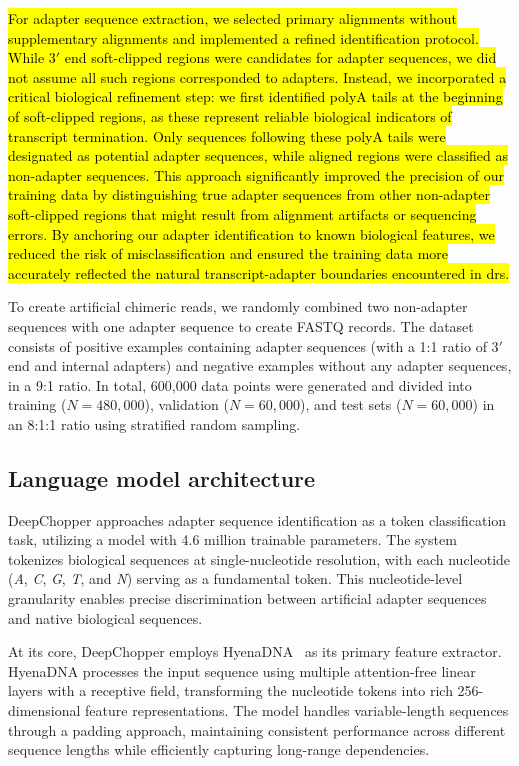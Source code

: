 \documentclass[pdflatex,sn-nature, lineno]{sn-jnl}%
\begin{document}
\hl{For adapter sequence extraction, we selected primary alignments without supplementary alignments and implemented a refined identification protocol. While $3'$ end soft-clipped regions were candidates for adapter sequences, we did not assume all such regions corresponded to adapters.
Instead, we incorporated a critical biological refinement step: we first identified polyA tails at the beginning of soft-clipped regions, as these represent reliable biological indicators of transcript termination.
Only sequences following these polyA tails were designated as potential adapter sequences, while aligned regions were classified as non-adapter sequences.
This approach significantly improved the precision of our training data by distinguishing true adapter sequences from other non-adapter soft-clipped regions that might result from alignment artifacts or sequencing errors.
By anchoring our adapter identification to known biological features, we reduced the risk of misclassification and ensured the training data more accurately reflected the natural transcript-adapter boundaries encountered in \mbox{\gls{drs}}.}

To create artificial chimeric reads, we randomly combined two non-adapter sequences with one adapter sequence to create FASTQ records.
The dataset consists of positive examples containing adapter sequences (with a 1:1 ratio of $3'$ end and internal adapters) and negative examples without any adapter sequences, in a 9:1 ratio.
In total, 600,000 data points were generated and divided into training ($N=480,000$), validation ($N=60,000$), and test sets ($N=60,000$) in an 8:1:1 ratio using stratified random sampling.

\subsection{Language model architecture}\label{ssec:lm}

DeepChopper approaches adapter sequence identification as a token classification task, utilizing a model with 4.6 million trainable parameters.
The system tokenizes biological sequences at single-nucleotide resolution, with each nucleotide (\emph{A}, \emph{C}, \emph{G}, \emph{T}, and \emph{N}) serving as a fundamental token.
This nucleotide-level granularity enables precise discrimination between artificial adapter sequences and native biological sequences.

At its core, DeepChopper employs HyenaDNA~\cite{nguyen2024hyenadna} as its primary feature extractor.
HyenaDNA processes the input sequence using multiple attention-free linear layers with a receptive field, transforming the nucleotide tokens into rich 256-dimensional feature representations.
The model handles variable-length sequences through a padding approach, maintaining consistent performance across different sequence lengths while efficiently capturing long-range dependencies.
\end{document}
